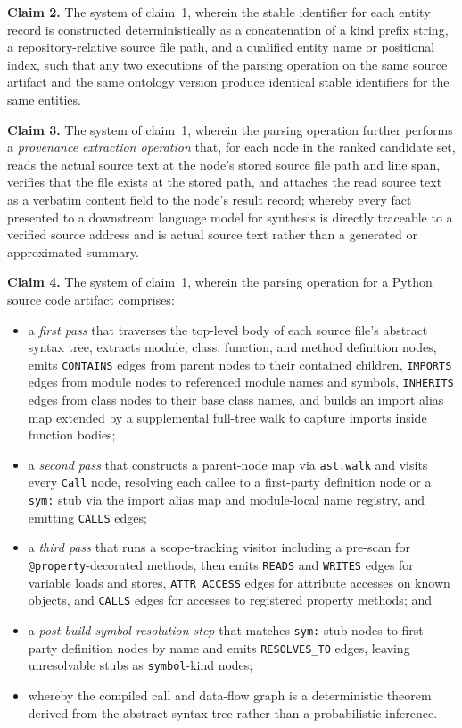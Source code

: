 \documentclass[12pt]{article}
\begin{document}
\bigskip
\noindent\textbf{Claim 2.}\quad
The system of claim~1, wherein the stable identifier for each entity record is
constructed deterministically as a concatenation of a kind prefix string, a
repository-relative source file path, and a qualified entity name or positional
index, such that any two executions of the parsing operation on the same source
artifact and the same ontology version produce identical stable identifiers for
the same entities.

\bigskip
\noindent\textbf{Claim 3.}\quad
The system of claim~1, wherein the parsing operation further performs a
\emph{provenance extraction operation} that, for each node in the ranked
candidate set, reads the actual source text at the node's stored source file path
and line span, verifies that the file exists at the stored path, and attaches the
read source text as a verbatim content field to the node's result record; whereby
every fact presented to a downstream language model for synthesis is directly
traceable to a verified source address and is actual source text rather than a
generated or approximated summary.

\bigskip
\noindent\textbf{Claim 4.}\quad
The system of claim~1, wherein the parsing operation for a Python source code
artifact comprises:
\begin{itemize}[leftmargin=2.5em]
  \item a \emph{first pass} that traverses the top-level body of each source
    file's abstract syntax tree, extracts module, class, function, and method
    definition nodes, emits \texttt{CONTAINS} edges from parent nodes to their
    contained children, \texttt{IMPORTS} edges from module nodes to referenced
    module names and symbols, \texttt{INHERITS} edges from class nodes to their
    base class names, and builds an import alias map extended by a supplemental
    full-tree walk to capture imports inside function bodies;
  \item a \emph{second pass} that constructs a parent-node map via
    \texttt{ast.walk} and visits every \texttt{Call} node, resolving each callee
    to a first-party definition node or a \texttt{sym:} stub via the import
    alias map and module-local name registry, and emitting \texttt{CALLS} edges;
  \item a \emph{third pass} that runs a scope-tracking visitor including a
    pre-scan for \texttt{@property}-decorated methods, then emits \texttt{READS}
    and \texttt{WRITES} edges for variable loads and stores,
    \texttt{ATTR\_ACCESS} edges for attribute accesses on known objects, and
    \texttt{CALLS} edges for accesses to registered property methods; and
  \item a \emph{post-build symbol resolution step} that matches \texttt{sym:}
    stub nodes to first-party definition nodes by name and emits
    \texttt{RESOLVES\_TO} edges, leaving unresolvable stubs as
    \texttt{symbol}-kind nodes;
  \item whereby the compiled call and data-flow graph is a deterministic theorem
    derived from the abstract syntax tree rather than a probabilistic inference.
\end{itemize}
\end{document}
